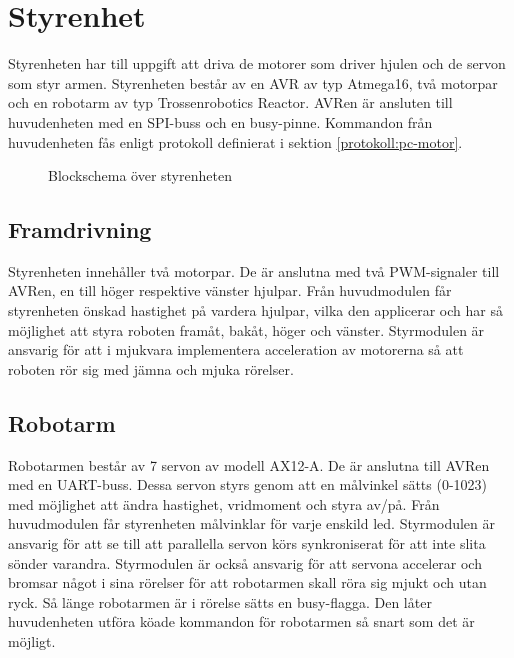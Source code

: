 \section{Styrenhet}
Styrenheten har till uppgift att driva de motorer som driver hjulen och de servon som styr armen. Styrenheten består av en AVR av typ Atmega16, två motorpar och en robotarm av typ Trossenrobotics Reactor. AVRen är ansluten till huvudenheten med en SPI-buss och en busy-pinne. Kommandon från huvudenheten fås enligt protokoll definierat i sektion \ref{protokoll:pc-motor}. 

\begin{figure}[h]
\center

\caption{Blockschema över styrenheten}
\end{figure}

\subsection{Framdrivning}

Styrenheten innehåller två motorpar. De är anslutna med två PWM-signaler till AVRen, en till höger respektive vänster hjulpar. Från huvudmodulen får styrenheten önskad hastighet på vardera hjulpar, vilka den applicerar och har så möjlighet att styra roboten framåt, bakåt, höger och vänster. Styrmodulen är ansvarig för att i mjukvara implementera acceleration av motorerna så att roboten rör sig med jämna och mjuka rörelser.

\subsection{Robotarm}

Robotarmen består av 7 servon av modell AX12-A. De är anslutna till AVRen med en UART-buss. Dessa servon styrs genom att en målvinkel sätts (0-1023) med möjlighet att ändra hastighet, vridmoment och styra av/på. Från huvudmodulen får styrenheten målvinklar för varje enskild led. Styrmodulen är ansvarig för att se till att parallella servon körs synkroniserat för att inte slita sönder varandra. Styrmodulen är också ansvarig för att servona accelerar och bromsar något i sina rörelser för att robotarmen skall röra sig mjukt och utan ryck. Så länge robotarmen är i rörelse sätts en busy-flagga. Den låter huvudenheten utföra köade kommandon för robotarmen så snart som det är möjligt. 

